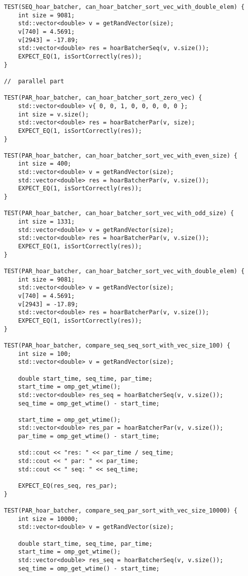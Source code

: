 \documentclass{report}
\begin{document}
\begin{lstlisting}
TEST(SEQ_hoar_batcher, can_hoar_batcher_sort_vec_with_double_elem) {
    int size = 9081;
    std::vector<double> v = getRandVector(size);
    v[740] = 4.5691;
    v[2943] = -17.89;
    std::vector<double> res = hoarBatcherSeq(v, v.size());
    EXPECT_EQ(1, isSortCorrectly(res));
}

//  parallel part

TEST(PAR_hoar_batcher, can_hoar_batcher_sort_zero_vec) {
    std::vector<double> v{ 0, 0, 1, 0, 0, 0, 0, 0 };
    int size = v.size();
    std::vector<double> res = hoarBatcherPar(v, size);
    EXPECT_EQ(1, isSortCorrectly(res));
}

TEST(PAR_hoar_batcher, can_hoar_batcher_sort_vec_with_even_size) {
    int size = 400;
    std::vector<double> v = getRandVector(size);
    std::vector<double> res = hoarBatcherPar(v, v.size());
    EXPECT_EQ(1, isSortCorrectly(res));
}

TEST(PAR_hoar_batcher, can_hoar_batcher_sort_vec_with_odd_size) {
    int size = 1331;
    std::vector<double> v = getRandVector(size);
    std::vector<double> res = hoarBatcherPar(v, v.size());
    EXPECT_EQ(1, isSortCorrectly(res));
}

TEST(PAR_hoar_batcher, can_hoar_batcher_sort_vec_with_double_elem) {
    int size = 9081;
    std::vector<double> v = getRandVector(size);
    v[740] = 4.5691;
    v[2943] = -17.89;
    std::vector<double> res = hoarBatcherPar(v, v.size());
    EXPECT_EQ(1, isSortCorrectly(res));
}

TEST(PAR_hoar_batcher, compare_seq_seq_sort_with_vec_size_100) {
    int size = 100;
    std::vector<double> v = getRandVector(size);

    double start_time, seq_time, par_time;
    start_time = omp_get_wtime();
    std::vector<double> res_seq = hoarBatcherSeq(v, v.size());
    seq_time = omp_get_wtime() - start_time;

    start_time = omp_get_wtime();
    std::vector<double> res_par = hoarBatcherPar(v, v.size());
    par_time = omp_get_wtime() - start_time;

    std::cout << "res: " << par_time / seq_time;
    std::cout << " par: " << par_time;
    std::cout << " seq: " << seq_time;

    EXPECT_EQ(res_seq, res_par);
}

TEST(PAR_hoar_batcher, compare_seq_par_sort_with_vec_size_10000) {
    int size = 10000;
    std::vector<double> v = getRandVector(size);

    double start_time, seq_time, par_time;
    start_time = omp_get_wtime();
    std::vector<double> res_seq = hoarBatcherSeq(v, v.size());
    seq_time = omp_get_wtime() - start_time;


\end{lstlisting}
\end{document}
